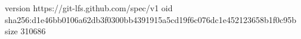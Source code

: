 version https://git-lfs.github.com/spec/v1
oid sha256:d1e46bb0106a62db3f0300bb4391915a5cd19f6c076dc1e452123658b1f0c95b
size 310686
